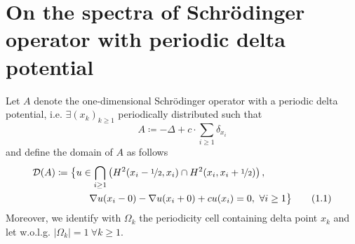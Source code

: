 \documentclass[14pt,a4paper]{scrartcl}
\numberwithin{equation}{section}
\begin{document}
\pagestyle{headings}

\section{On the spectra of Schrödinger operator with periodic delta potential}

Let $A$ denote the one-dimensional Schrödinger operator with a periodic delta potential, i.e. $\exists (x_{k})_{k \geq 1}$ periodically distributed such that
	\[ A \coloneqq - \Delta + c \cdot \sum_{i \geq 1} \delta_{x_{i}} \]
and define the domain of $A$ as follows
	\begin{align*}
		\mathcal{D}(A) \coloneqq \big\{ & u \in  \bigcap_{i \geq 1} \left( H^{2}(x_{i}-\nicefrac{1}{2}, x_{i}) \cap H^{2}(x_{i}, x_{i} + \nicefrac{1}{2}) \right), \\
			& ~\quad \nabla u(x_{i} - 0) - \nabla u(x_{i} + 0) + c u(x_{i}) = 0 , ~\forall i \geq 1 \big\} \nonumber \tag{1.1} \label{1.1}
	\end{align*}
	Moreover, we identify with $\Omega_{k}$ the periodicity cell containing delta point $x_{k}$ and let w.o.l.g. $|\Omega_{k}| = 1 ~\forall k \geq 1$. 
\end{document}
